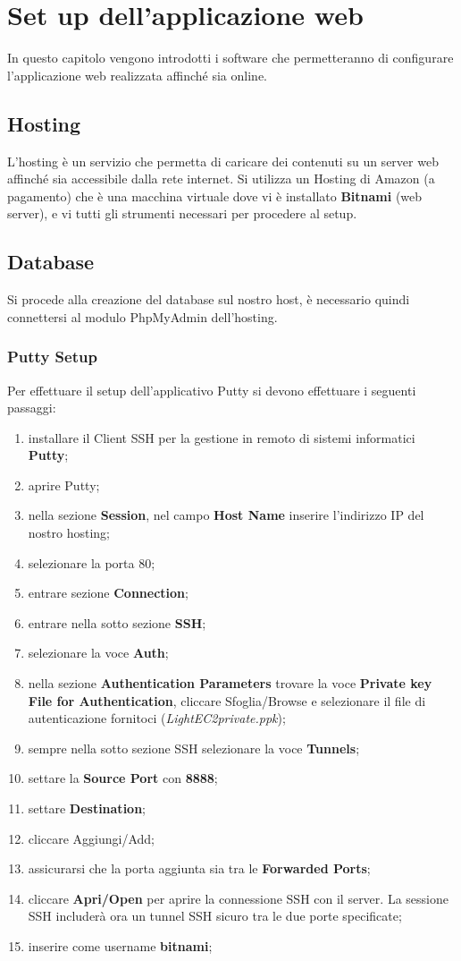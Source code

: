 \chapter{Set up dell'applicazione web}
In questo capitolo vengono introdotti i software che permetteranno di configurare  l'applicazione web realizzata affinché sia online.

\section{Hosting}
L'hosting è un servizio che permetta di caricare dei contenuti su un server web affinché sia accessibile dalla rete internet.
Si utilizza un Hosting di Amazon (a pagamento) che è una macchina virtuale dove vi è installato \textbf{Bitnami} (web server), e vi tutti gli strumenti necessari per procedere al setup.

\section{Database}
Si procede alla creazione del database sul nostro host, è necessario quindi connettersi al modulo PhpMyAdmin dell'hosting.

\subsection{Putty Setup}
Per effettuare il setup dell'applicativo Putty si devono effettuare i seguenti passaggi:
\begin{enumerate}
\item installare il Client SSH per la gestione in remoto di sistemi informatici \textbf{Putty};
\item aprire Putty;
\item nella sezione \textbf{Session}, nel campo \textbf{Host Name} inserire l'indirizzo IP del nostro hosting;
\item selezionare la porta 80;
\item entrare sezione \textbf{Connection};
\item entrare nella sotto sezione \textbf{SSH};
\item selezionare la voce \textbf{Auth};
\item nella sezione \textbf{Authentication Parameters} trovare la voce \textbf{Private key File for Authentication}, cliccare Sfoglia/Browse e selezionare il file di autenticazione fornitoci (\textit{LightEC2private.ppk});
\item sempre nella sotto sezione SSH selezionare la voce \textbf{Tunnels};
\item settare la \textbf{Source Port} con \textbf{8888};
\item settare \textbf{Destination};
\item cliccare Aggiungi/Add;
\item assicurarsi che la porta aggiunta sia tra le \textbf{Forwarded Ports};
\item cliccare \textbf{Apri/Open} per aprire la connessione SSH con il server. La sessione SSH includerà ora un tunnel SSH sicuro tra le due porte specificate;
\item inserire come username \textbf{bitnami};
\end{enumerate}

